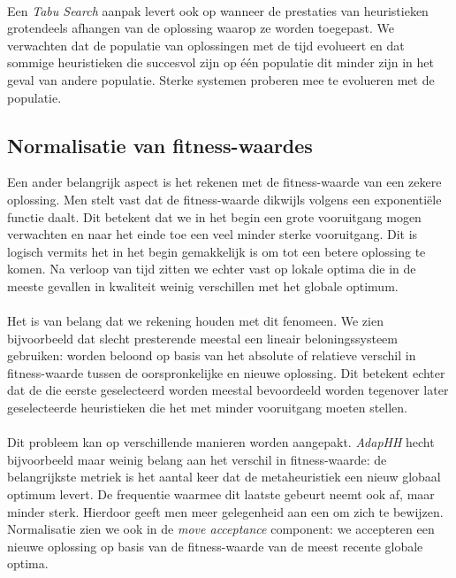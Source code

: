 \paragraph{}
Een \emph{Tabu Search} aanpak levert ook op wanneer de prestaties van heuristieken grotendeels afhangen van de oplossing waarop ze worden toegepast. We verwachten dat de populatie van oplossingen met de tijd evolueert en dat sommige heuristieken die succesvol zijn op \'e\'en populatie dit minder zijn in het geval van andere populatie. Sterke systemen proberen mee te evolueren met de populatie.

\subsection{Normalisatie van fitness-waardes}
Een ander belangrijk aspect is het rekenen met de fitness-waarde van een zekere oplossing. Men stelt vast dat de fitness-waarde dikwijls volgens een exponenti\"ele functie daalt. Dit betekent dat we in het begin een grote vooruitgang mogen verwachten en naar het einde toe een veel minder sterke vooruitgang. Dit is logisch vermits het in het begin gemakkelijk is om tot een betere oplossing te komen. Na verloop van tijd zitten we echter vast op lokale optima die in de meeste gevallen in kwaliteit weinig verschillen met het globale optimum.

\paragraph{}
Het is van belang dat we rekening houden met dit fenomeen. We zien bijvoorbeeld dat slecht presterende \abhhn{} meestal een lineair beloningssysteem gebruiken: \abhn{} worden beloond op basis van het absolute of relatieve verschil in fitness-waarde tussen de oorspronkelijke en nieuwe oplossing. Dit betekent echter dat de \abhn{} die eerste geselecteerd worden meestal bevoordeeld worden tegenover later geselecteerde heuristieken die het met minder vooruitgang moeten stellen.

\paragraph{}
Dit probleem kan op verschillende manieren worden aangepakt. \emph{AdapHH} hecht bijvoorbeeld maar weinig belang aan het verschil in fitness-waarde: de belangrijkste metriek is het aantal keer dat de metaheuristiek een nieuw globaal optimum levert. De frequentie waarmee dit laatste gebeurt neemt ook af, maar minder sterk. Hierdoor geeft men meer gelegenheid aan een \abh{} om zich te bewijzen. Normalisatie zien we ook in de \emph{move acceptance} component: we accepteren een nieuwe oplossing op basis van de fitness-waarde van de meest recente globale optima. %

